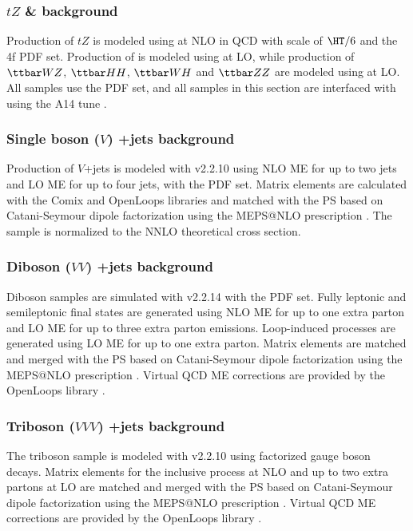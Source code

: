 \documentclass[../thesis.tex]{subfiles}
\begin{document}
\subsubsection*{$tZ$ \& \ttVV background}
Production of $tZ$ is modeled using \mgamc \citep{Alwall:2014hca} at \acs{NLO} in \acs{QCD} with scale of $\HT/6$ and the \nnpdfnlo 4f \citep{Ball:2014uwa} \acs{PDF} set. Production of \ttWW is modeled using \mgamc \citep{Alwall:2014hca} at \acs{LO}, while production of $\ttbar WZ$, $\ttbar HH$, $\ttbar WH$ and $\ttbar ZZ$ are modeled using \mg at \acs{LO}. All \ttVV samples use the \nnpdfnlo \citep{Ball:2014uwa} \acs{PDF} set, and all samples in this section are interfaced with \pythia \citep{Sjostrand:2014zea} using the A14 tune \citep{ATL-PHYS-PUB-2014-021}.
\subsubsection*{Single boson ($V$) +jets background}
Production of $V$+jets is modeled with \sherpa v2.2.10 \citep{Bothmann:2019yzt} using \acs{NLO} \acs{ME} for up to two jets and \acs{LO} \acs{ME} for up to four jets, with the \nnpdfnlo \citep{Ball:2014uwa} \acs{PDF} set. Matrix elements are calculated with the Comix \citep{Gleisberg:2008fv} and OpenLoops libraries \citep{Cascioli:2011va, Denner:2016kdg} and matched with the \sherpa \acs{PS} based on Catani-Seymour dipole factorization \citep{Schumann:2007mg} using the MEPS@NLO prescription \citep{Hoeche:2011fd, Hoeche:2012yf, Catani:2001cc, Hoeche:2009rj}. The sample is normalized to the \acs{NNLO} \citep{Anastasiou:2003ds} theoretical cross section.
\subsubsection*{Diboson ($VV$) +jets background}
Diboson samples are simulated with \sherpa v2.2.14 \citep{Bothmann:2019yzt} with the \nnpdfnlo \citep{Ball:2014uwa} \acs{PDF} set. Fully leptonic and semileptonic final states are generated using \acs{NLO} \acs{ME} for up to one extra parton and  \acs{LO} \acs{ME} for up to three extra parton emissions. Loop-induced processes are generated using \acs{LO} \acs{ME} for up to one extra parton. Matrix elements are matched and merged with the \sherpa \acs{PS} based on Catani-Seymour dipole factorization \citep{Schumann:2007mg} using the MEPS@NLO prescription \citep{Hoeche:2011fd, Hoeche:2012yf, Catani:2001cc, Hoeche:2009rj}. Virtual \acs{QCD} \acs{ME} corrections are provided by the OpenLoops library \citep{Cascioli:2011va, Denner:2016kdg}.
\subsubsection*{Triboson ($VVV$) +jets background}
The triboson sample is modeled with \sherpa v2.2.10 \citep{Bothmann:2019yzt} using factorized gauge boson decays. Matrix elements for the inclusive process at \acs{NLO} and up to two extra partons at \acs{LO} are matched and merged with the \sherpa \acs{PS} based on Catani-Seymour dipole factorization \citep{Schumann:2007mg} using the MEPS@NLO prescription \citep{Hoeche:2011fd, Hoeche:2012yf, Catani:2001cc, Hoeche:2009rj}. Virtual \acs{QCD} \acs{ME} corrections are provided by the OpenLoops library \citep{Cascioli:2011va, Denner:2016kdg}.
\end{document}
